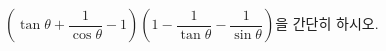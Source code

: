 $\left(\tan\theta+\dfrac{1}{\cos\theta}-1\right)\left(1-\dfrac{1}{\tan\theta}-\dfrac{1}{\sin\theta}\right)$을 간단히 하시오.
